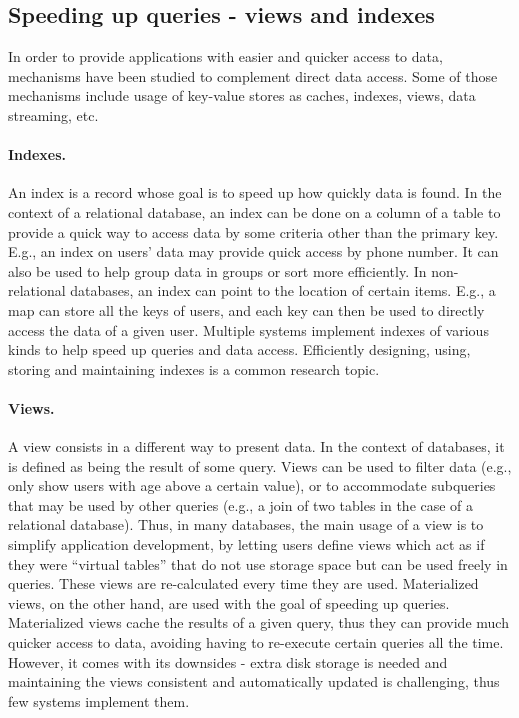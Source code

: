 

\subsection{Speeding up queries - views and indexes}

In order to provide applications with easier and quicker access to data, mechanisms have been studied to complement direct data access.
Some of those mechanisms include usage of key-value stores as caches, indexes, views, data streaming, etc.

\paragraph{Indexes.}
An index is a record whose goal is to speed up how quickly data is found.
In the context of a relational database, an index can be done on a column of a table to provide a quick way to access data by some criteria other than the primary key.
E.g., an index on users' data may provide quick access by phone number.
It can also be used to help group data in groups or sort more efficiently.
In non-relational databases, an index can point to the location of certain items.
E.g., a map can store all the keys of users, and each key can then be used to directly access the data of a given user.
Multiple systems implement indexes of various kinds to help speed up queries and data access.
Efficiently designing, using, storing and maintaining indexes is a common research topic.

\paragraph{Views.}
A view consists in a different way to present data.
In the context of databases, it is defined as being the result of some query.
Views can be used to filter data (e.g., only show users with age above a certain value), or to accommodate subqueries that may be used by other queries (e.g., a join of two tables in the case of a relational database).
Thus, in many databases, the main usage of a view is to simplify application development, by letting users define views which act as if they were ``virtual tables'' that do not use storage space but can be used freely in queries.
These views are re-calculated every time they are used.
Materialized views, on the other hand, are used with the goal of speeding up queries.
Materialized views cache the results of a given query, thus they can provide much quicker access to data, avoiding having to re-execute certain queries all the time.
However, it comes with its downsides - extra disk storage is needed and maintaining the views consistent and automatically updated is challenging, thus few systems implement them.

